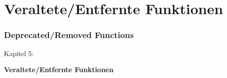 %

\section{Veraltete/Entfernte Funktionen}
\begin{frame}[fragile]
	\frametitle{Deprecated/Removed Functions}

	\begin{center}\huge{Kapitel 5:}\end{center}
	\begin{center}\huge{\color{typo3darkgrey}\textbf{Veraltete/Entfernte Funktionen}}\end{center}

\end{frame}

